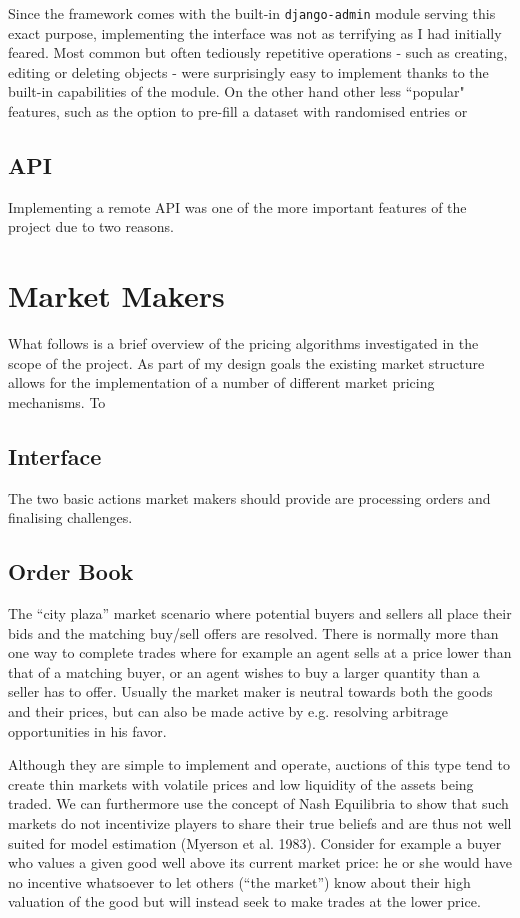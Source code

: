 \documentclass[bsc,frontabs,twoside,singlespacing,parskip,deptreport]{infthesis}     %
\begin{document}
	Since the framework comes with the built-in {\tt django-admin} module serving this exact purpose, implementing the interface was not as terrifying as I had initially feared. Most common but often tediously repetitive operations - such as creating, editing or deleting objects - were surprisingly easy to implement thanks to the built-in capabilities of the module. On the other hand other less ``popular" features, such as the option to pre-fill a dataset with randomised entries or 

\subsection{API}
	Implementing a remote API was one of the more important features of the project due to two reasons. 
\section{Market Makers}
	What follows is a brief overview of the pricing algorithms investigated in the scope of the project. As part of my design goals the existing market structure allows for the implementation of a number of different market pricing mechanisms. To 

\subsection{Interface}
	The two basic actions market makers should provide are processing orders and finalising challenges. 
	
\subsection{Order Book}
	
	The “city plaza” market scenario where potential buyers and sellers all place their bids and the matching buy/sell offers are resolved. There is normally more than one way to complete trades where for example an agent sells at a price lower than that of a matching buyer, or an agent wishes to buy a larger quantity than a seller has to offer. Usually the market maker is neutral towards both the goods and their prices, but can also be made active by e.g. resolving arbitrage opportunities in his favor.

	Although they are simple to implement and operate, auctions of this type tend to create thin markets with volatile prices and low liquidity of the assets being traded. We can furthermore use the concept of Nash Equilibria to show that such markets do not incentivize players to share their true beliefs and are thus not well suited for model estimation (Myerson et al. 1983). Consider for example a buyer who values a given good well above its current market price: he or she would have no incentive whatsoever to let others (“the market”) know about their high valuation of the good but will instead seek to make trades at the lower price.
	
\end{document}
